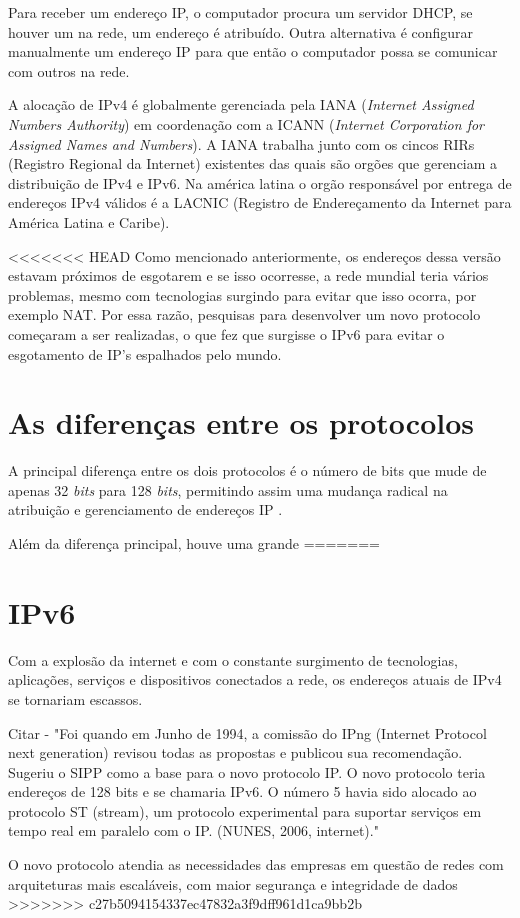 Para receber um endereço IP, o computador procura um servidor DHCP, se houver um na rede, um endereço é atribuído. Outra alternativa é configurar manualmente um endereço IP para que então o computador possa se comunicar com outros na rede.

A alocação de IPv4 é globalmente gerenciada pela IANA (\textit{Internet Assigned Numbers Authority}) em coordenação com a ICANN (\textit{Internet Corporation for Assigned Names and Numbers}). A IANA trabalha junto com os cincos RIRs (Registro Regional da Internet) existentes das quais são orgões que gerenciam a distribuição de IPv4 e IPv6. Na américa latina o orgão responsável por entrega de endereços IPv4 válidos é a LACNIC (Registro de Endereçamento da Internet para América Latina e Caribe).

<<<<<<< HEAD
Como mencionado anteriormente, os endereços dessa versão estavam próximos de esgotarem e se isso ocorresse, a rede mundial teria vários problemas, mesmo com tecnologias surgindo para evitar que isso ocorra, por exemplo NAT. Por essa razão, pesquisas para desenvolver um novo protocolo começaram a ser realizadas, o que fez que surgisse o IPv6 para evitar o esgotamento de IP's espalhados pelo mundo.

\section{As diferenças entre os protocolos}\label{sec:protIPv6}

A principal diferença entre os dois protocolos é o número de bits que mude de apenas 32 \textit{bits} para 128 \textit{bits}, permitindo assim uma mudança radical na atribuição e gerenciamento de endereços IP \cite{}.

Além da diferença principal, houve uma grande 
=======
\section{IPv6}\label{sec:protIPv6}

Com a explosão da internet e com o constante surgimento de tecnologias, aplicações, serviços e dispositivos conectados a rede, os endereços atuais de IPv4 se tornariam escassos. 

Citar - "Foi quando em Junho de 1994, a comissão do IPng (Internet Protocol next generation) revisou todas as propostas e publicou sua recomendação. Sugeriu o SIPP como a base para o novo protocolo IP. O novo protocolo teria endereços de 128 bits e se chamaria IPv6. O número 5 havia sido alocado ao protocolo ST (stream), um protocolo experimental para suportar serviços em tempo real em paralelo com o IP. (NUNES, 2006, internet)."

O novo protocolo atendia as necessidades das empresas em questão de redes com arquiteturas mais escaláveis, com maior segurança e integridade de dados 
>>>>>>> c27b5094154337ec47832a3f9dff961d1ca9bb2b
